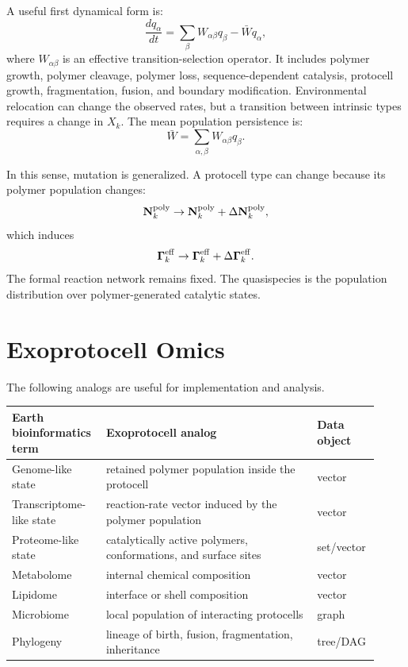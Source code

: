 \documentclass[11pt]{article}
\begin{document}
A useful first dynamical form is:
\begin{equation}
\frac{dq_\alpha}{dt}
=
\sum_\beta W_{\alpha\beta}q_\beta
-
\bar{W}q_\alpha,
\end{equation}
where $W_{\alpha\beta}$ is an effective transition-selection operator. It includes polymer growth, polymer cleavage, polymer loss, sequence-dependent catalysis, protocell growth, fragmentation, fusion, and boundary modification. Environmental relocation can change the observed rates, but a transition between intrinsic types requires a change in $X_k$. The mean population persistence is:
\begin{equation}
\bar{W}
=
\sum_{\alpha,\beta} W_{\alpha\beta}q_\beta.
\end{equation}

In this sense, mutation is generalized. A protocell type can change because its polymer population changes:
\begin{equation}
\mathbf{N}^{\rm poly}_k
\rightarrow
\mathbf{N}^{\rm poly}_k+\Delta\mathbf{N}^{\rm poly}_k,
\end{equation}
which induces
\begin{equation}
\boldsymbol{\Gamma}^{\rm eff}_k
\rightarrow
\boldsymbol{\Gamma}^{\rm eff}_k+\Delta\boldsymbol{\Gamma}^{\rm eff}_k.
\end{equation}
The formal reaction network remains fixed. The quasispecies is the population distribution over polymer-generated catalytic states.

\section{Exoprotocell Omics}

The following analogs are useful for implementation and analysis.

\begin{center}
\small
\begin{tabular}{p{0.24\linewidth}p{0.55\linewidth}p{0.13\linewidth}}
\toprule
Earth bioinformatics term & Exoprotocell analog & Data object \\
\midrule
Genome-like state & retained polymer population inside the protocell & vector \\
Transcriptome-like state & reaction-rate vector induced by the polymer population & vector \\
Proteome-like state & catalytically active polymers, conformations, and surface sites & set/vector \\
Metabolome & internal chemical composition & vector \\
Lipidome & interface or shell composition & vector \\
Microbiome & local population of interacting protocells & graph \\
Phylogeny & lineage of birth, fusion, fragmentation, inheritance & tree/DAG \\
\bottomrule
\end{tabular}
\end{center}
\end{document}
